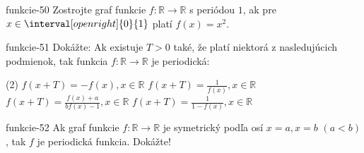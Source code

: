 \begin{defproblem}{funkcie-50}
Zostrojte graf funkcie $f:\mathbb{R} \rightarrow \mathbb{R}$ s periódou $1$, ak
pre $x \in \interval[open right]{0}{1}$ platí $f(x) = x^2$.
\end{defproblem}

\begin{defproblem}{funkcie-51}
Dokážte: Ak existuje $T>0$ také, že platí niektorá z nasledujúcich podmienok,
tak funkcia $f:\mathbb{R} \rightarrow \mathbb{R}$ je periodická:
\begin{tasks}(2)
  \task $f(x+T)=-f(x),x\in\mathbb{R}$
  \task $f(x+T)=\frac{1}{f(x)},x\in\mathbb{R}$
  \task $f(x+T)=\frac{f(x)+a}{bf(x)-1},x\in\mathbb{R}$
  \task $f(x+T)=\frac{1}{1-f(x)},x\in\mathbb{R}$
\end{tasks}
\end{defproblem}

\begin{defproblem}{funkcie-52}
Ak graf funkcie $f:\mathbb{R} \rightarrow \mathbb{R}$ je symetrický podľa osí
$x = a,x = b$ $(a < b)$, tak $f$ je periodická funkcia. Dokážte!
\end{defproblem}

